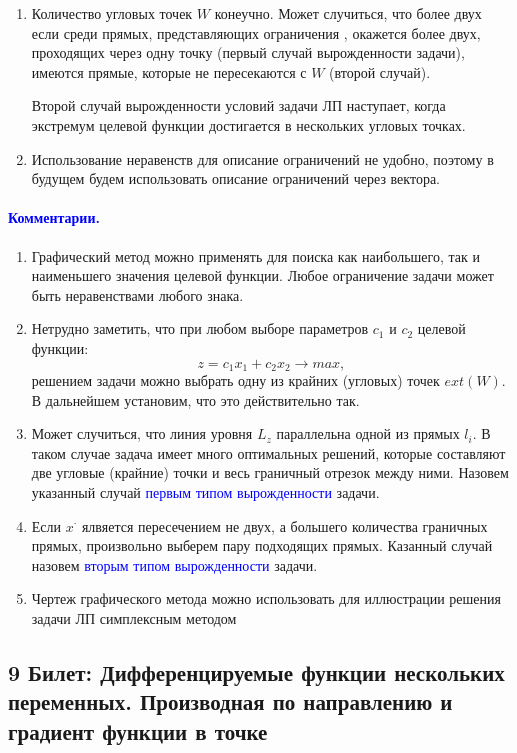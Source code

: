 \documentclass[14pt, letterpaper]{article}
\begin{document}
\begin{enumerate}
    \item Количество угловых точек $W$ конеучно. Может случиться, что более двух если среди прямых, представляющих ограничения , окажется более двух, проходящих через одну точку (первый случай вырожденности задачи), имеются прямые, которые не пересекаются с $W$ (второй случай).

    Второй случай вырожденности условий задачи ЛП наступает, когда экстремум целевой функции достигается в нескольких угловых точках.
    
    \item Использование неравенств для описание ограничений не удобно, поэтому в будущем будем использовать описание ограничений через вектора.
\end{enumerate}

\paragraph{\textcolor{blue}{Комментарии.}}
\begin{enumerate}
    \item Графический метод можно применять для поиска как наибольшего, так и наименьшего значения целевой функции. Любое ограничение задачи может быть неравенствами любого знака.
    
    \item Нетрудно заметить, что при любом выборе параметров $c_{1}$ и $c_{2}$ целевой функции:
    $$z = c_{1}x_{1} + c_{2}x_{2} \rightarrow max, $$
    решением задачи можно выбрать одну из крайних (угловых) точек $ext(W)$. В дальнейшем установим, что это действительно так.
    
    \item Может случиться, что линия уровня $L_{z}$ параллельна одной из прямых $l_{i}$. В таком случае задача имеет много оптимальных решений, которые составляют две угловые (крайние) точки и весь граничный отрезок между ними.
    Назовем указанный случай \textcolor{blue}{первым типом вырожденности} задачи.
    \item Если $x^{ \cdot }$ ялвяется пересечением не двух, а большего количества граничных прямых, произвольно выберем пару подходящих прямых. Казанный случай назовем \textcolor{blue}{вторым типом вырожденности} задачи.
    \item Чертеж графического метода можно использовать для иллюстрации решения задачи ЛП симплексным методом
\end{enumerate}


\newpage
\subsection{9 Билет: Дифференцируемые функции нескольких переменных. Производная по направлению и градиент функции в точке}
\end{document}
